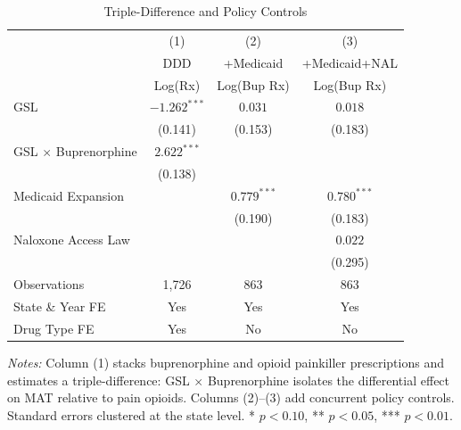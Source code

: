 \begin{table}[H]
\centering
\caption{Triple-Difference and Policy Controls}
\begin{threeparttable}
\begin{tabular}{lccc}
\toprule
 & (1) & (2) & (3) \\
 & DDD & +Medicaid & +Medicaid+NAL \\
 & Log(Rx) & Log(Bup Rx) & Log(Bup Rx) \\
\midrule
GSL & $-1.262^{***}$ & $0.031$ & $0.018$ \\
 & (0.141) & (0.153) & (0.183) \\
GSL $\times$ Buprenorphine & $2.622^{***}$ & & \\
 & (0.138) & & \\
Medicaid Expansion & & $0.779^{***}$ & $0.780^{***}$ \\
 & & (0.190) & (0.183) \\
Naloxone Access Law & & & $0.022$ \\
 & & & (0.295) \\
\midrule
Observations & 1,726 & 863 & 863 \\
State \& Year FE & Yes & Yes & Yes \\
Drug Type FE & Yes & No & No \\
\bottomrule
\end{tabular}
\begin{tablenotes}[flushleft]
\small
\item \textit{Notes:} Column (1) stacks buprenorphine and opioid painkiller prescriptions and estimates a triple-difference: GSL $\times$ Buprenorphine isolates the differential effect on MAT relative to pain opioids. Columns (2)--(3) add concurrent policy controls. Standard errors clustered at the state level. * $p<0.10$, ** $p<0.05$, *** $p<0.01$.
\end{tablenotes}
\end{threeparttable}
\label{tab:ddd}
\end{table}

